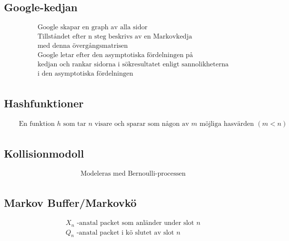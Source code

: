 \subsection{Google-kedjan}
\begin{align*}
  &\quad  \text{Google skapar en graph av alla sidor} \\
  &\quad  \text{Tillståndet efter n steg beskrivs av en Markovkedja} \\
  &\quad  \text{med denna övergångsmatrisen} \\
  &\quad  \text{Google letar efter den asymptotiska fördelningen på } \\
  &\quad  \text{kedjan och rankar sidorna i sökresultatet enligt sannolikheterna} \\
  &\quad  \text{i den asymptotiska fördelningen} \\
\end{align*}

\subsection{Hashfunktioner}
\begin{align*}
  &\quad  \text{En funktion $h$ som tar $n$ visare och sparar som någon av $m$ möjliga hasvärden $(m<n)$} \\
\end{align*}

\subsection{Kollisionmodoll}
\begin{align*}
  &\quad  \text{Modeleras med Bernoulli-processen} \\
\end{align*}

\subsection{Markov Buffer/Markovkö}
\begin{align*}
  &\quad  \text{$X_n$ -anatal packet som anländer under slot $n$} \\
  &\quad  \text{$Q_n$ -anatal packet i kö slutet av slot $n$} \\
\end{align*}
